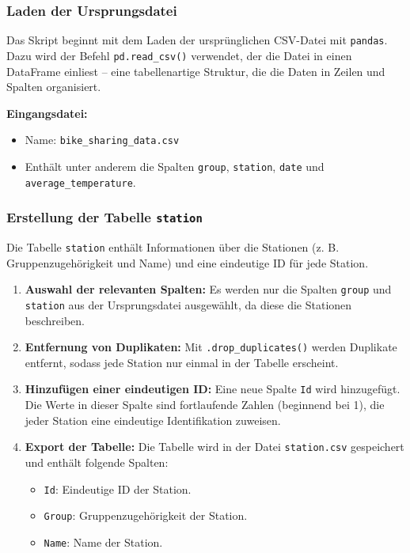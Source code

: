 \documentclass[a4paper,12pt]{article}
\begin{document}
\subsubsection{Laden der Ursprungsdatei}
Das Skript beginnt mit dem Laden der ursprünglichen CSV-Datei mit \texttt{pandas}. Dazu wird der Befehl \texttt{pd.read\_csv()} verwendet, der die Datei in einen DataFrame einliest – eine tabellenartige Struktur, die die Daten in Zeilen und Spalten organisiert.

\textbf{Eingangsdatei:}
\begin{itemize}
    \item Name: \texttt{bike\_sharing\_data.csv}
    \item Enthält unter anderem die Spalten \texttt{group}, \texttt{station}, \texttt{date} und \texttt{average\_temperature}.
\end{itemize}

\subsubsection{Erstellung der Tabelle \texttt{station}}
Die Tabelle \texttt{station} enthält Informationen über die Stationen (z. B. Gruppenzugehörigkeit und Name) und eine eindeutige ID für jede Station.

\begin{enumerate}
    \item \textbf{Auswahl der relevanten Spalten:}
    Es werden nur die Spalten \texttt{group} und \texttt{station} aus der Ursprungsdatei ausgewählt, da diese die Stationen beschreiben.
    
    \item \textbf{Entfernung von Duplikaten:}
    Mit \texttt{.drop\_duplicates()} werden Duplikate entfernt, sodass jede Station nur einmal in der Tabelle erscheint.
    
    \item \textbf{Hinzufügen einer eindeutigen ID:}
    Eine neue Spalte \texttt{Id} wird hinzugefügt. Die Werte in dieser Spalte sind fortlaufende Zahlen (beginnend bei 1), die jeder Station eine eindeutige Identifikation zuweisen.
    
    \item \textbf{Export der Tabelle:}
    Die Tabelle wird in der Datei \texttt{station.csv} gespeichert und enthält folgende Spalten:
    \begin{itemize}
        \item \texttt{Id}: Eindeutige ID der Station.
        \item \texttt{Group}: Gruppenzugehörigkeit der Station.
        \item \texttt{Name}: Name der Station.
    \end{itemize}
\end{enumerate}
\end{document}
